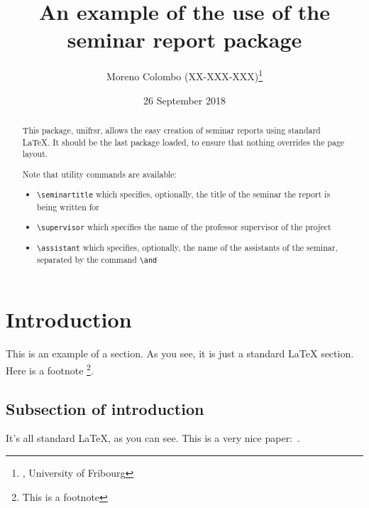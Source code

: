 \documentclass[a4paper,12pt]{article}
\begin{document}

\title{An example of the use of the seminar report package} %

\author{Moreno Colombo (XX-XXX-XXX)\thanks{, University of Fribourg}
   }	%



\date{26 September 2018} %

\maketitle

\begin{abstract}
This package, \textsf{unifrsr}, allows the easy creation of seminar
reports using standard \LaTeX. It should be the last
package loaded, to ensure that nothing overrides the page layout.

Note that utility commands are available: 
\begin{itemize}
\item \verb+\seminartitle+ which specifies, optionally, the title of the seminar the report is being written for
\item \verb+\supervisor+ which specifies the name of the professor supervisor of the project
\item \verb+\assistant+ which specifies, optionally, the name of the assistants of the seminar, separated by the command \verb+\and+
\end{itemize}


\end{abstract}

\tableofcontents
\newpage

\section{Introduction}
This is an example of a section. As you see, it is just a standard
{\LaTeX} section. Here is a footnote%
\footnote{This is a footnote}.

\subsection{Subsection of introduction}
It's all standard \LaTeX, as you can see.
This is a very nice paper:~\cite{zadeh}.



\end{document}
